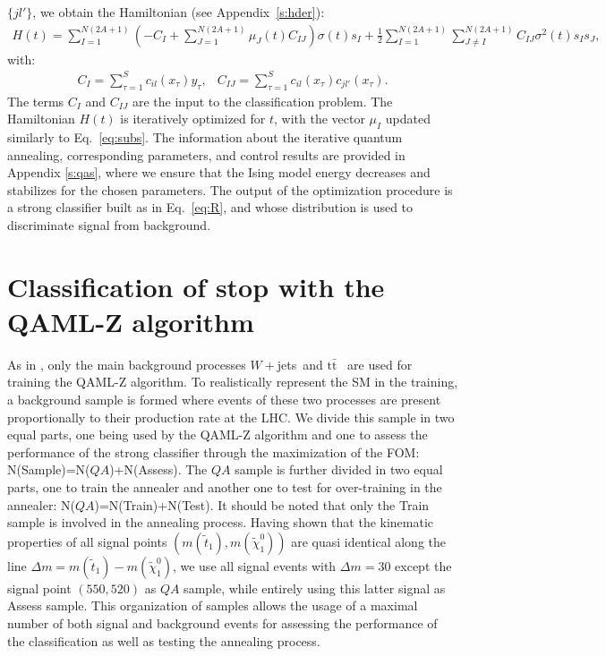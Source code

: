 \documentclass{article}
\newcommand{\wjets}{\ensuremath{W+}jets~}
\newcommand{\ttbar}{\ensuremath{\mathrm{t}\bar{\mathrm{t}}}~}
\begin{document}
$\{jl'\}$, we obtain the Hamiltonian (see Appendix~\ref{s:hder}):
\begin{eqnarray}
  H(t) = \sum_{I=1}^{N(2A+1)}\left( -C_I + \sum_{J=1}^{N(2A+1)}\mu_J(t) C_{IJ}\right)\sigma(t) s_I
  + \frac{1}{2}\sum_{I=1}^{N(2A+1)}\sum_{J\neq I}^{N(2A+1)} C_{IJ}\sigma^2(t)s_I s_J, 
\label{eq:Hta}
\end{eqnarray}
with:
\begin{eqnarray}
  C_{I} = \sum\limits_{\tau=1}^{S}c_{il}(x_{\tau})y_{\tau}, &
  C_{IJ} = \sum\limits_{\tau=1}^{S}c_{il}(x_{\tau})c_{jl'}(x_{\tau}).
\label{eq:cia}
\end{eqnarray}
The terms $C_I$ and $C_{IJ}$ are the input to the classification problem. 
The Hamiltonian $H(t)$ is iteratively optimized for $t$, with the vector 
$\mu_I$ updated similarly to Eq.~\ref{eq:subs}. The information about the 
iterative quantum annealing, corresponding parameters, and control results 
are provided in Appendix \ref{s:qas}, where we ensure that the Ising model 
energy decreases and stabilizes for the chosen parameters. The output of 
the optimization procedure is a strong classifier built as in 
Eq.~\ref{eq:R}, and whose distribution is used to discriminate signal from 
background.

\section{Classification of stop with the QAML-Z algorithm}
\label{s:qastop}

As in \cite{st4bd}, only the main background processes \wjets and \ttbar 
are used for training the QAML-Z algorithm. To realistically represent the 
SM in the training, a background sample is formed where events of these 
two processes are present proportionally to their production rate at the 
LHC. We divide this sample in two equal parts, one being used by the 
QAML-Z algorithm and one to assess the performance of the strong 
classifier through the maximization of the FOM: 
N(Sample)=N($QA$)+N(Assess). The $QA$ sample is further divided in two 
equal parts, one to train the annealer and another one to test for 
over-training in the annealer: N($QA$)=N(Train)+N(Test). It should be 
noted that only the Train sample is involved in the annealing process. 
Having shown \cite{st4bd} that the kinematic properties of all signal 
points $(m(\tilde{t}_{1}),m(\tilde{\chi}_{1}^{0}))$ are quasi identical 
along the line $\Delta m = m(\tilde{t}_{1}) - m(\tilde{\chi}_{1}^{0})$, we 
use all signal events with $\Delta m = 30$ except the signal point 
$(550,520)$ as $QA$ sample, while entirely using this latter signal as 
Assess sample. This organization of samples allows the usage of a maximal 
number of both signal and background events for assessing the performance 
of the classification as well as testing the annealing process.
\end{document}
